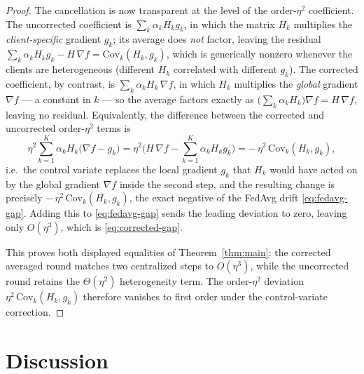 \documentclass[11pt]{article}
\theoremstyle{definition}
\theoremstyle{remark}
\begin{document}
\begin{proof}
The cancellation is now transparent at the level of the order-$\eta^2$ coefficient. The
uncorrected coefficient is $\sum_k\alpha_k H_k g_k$, in which the matrix $H_k$ multiplies the
\emph{client-specific} gradient $g_k$; its average does \emph{not} factor, leaving the residual
$\sum_k\alpha_k H_k g_k-H\,\nabla f=\mathrm{Cov}_k(H_k,g_k)$, which is generically nonzero
whenever the clients are heterogeneous (different $H_k$ correlated with different $g_k$). The
corrected coefficient, by contrast, is $\sum_k\alpha_k H_k\,\nabla f$, in which $H_k$
multiplies the \emph{global} gradient $\nabla f$ --- a constant in $k$ --- so the average
factors exactly as $\big(\sum_k\alpha_k H_k\big)\nabla f=H\,\nabla f$, leaving no residual.
Equivalently, the difference between the corrected and uncorrected order-$\eta^2$ terms is
\begin{equation}
  \eta^2\sum_{k=1}^{K}\alpha_k H_k\big(\nabla f-g_k\big)
  = \eta^2\Big(H\,\nabla f-\sum_{k=1}^{K}\alpha_k H_k g_k\Big)
  = -\,\eta^2\,\mathrm{Cov}_k(H_k,g_k),
  \label{eq:explicit-removal}
\end{equation}
i.e.\ the control variate replaces the local gradient $g_k$ that $H_k$ would have acted on by
the global gradient $\nabla f$ inside the second step, and the resulting change is precisely
$-\,\eta^2\,\mathrm{Cov}_k(H_k,g_k)$, the exact negative of the FedAvg drift
\eqref{eq:fedavg-gap}. Adding this to \eqref{eq:fedavg-gap} sends the leading deviation to
zero, leaving only $O(\eta^3)$, which is \eqref{eq:corrected-gap}.

This proves both displayed equalities of Theorem~\ref{thm:main}: the corrected averaged round
matches two centralized steps to $O(\eta^3)$, while the uncorrected round retains the
$\Theta(\eta^2)$ heterogeneity term. The order-$\eta^2$ deviation
$\eta^2\,\mathrm{Cov}_k(H_k,g_k)$ therefore vanishes to first order under the control-variate
correction.
\end{proof}

\section*{Discussion}
\end{document}
